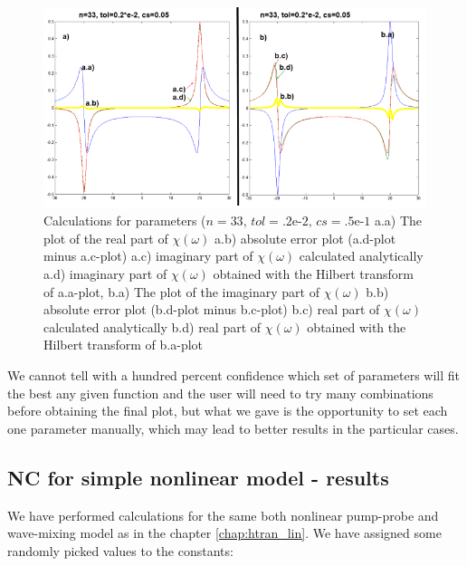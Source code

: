 \documentclass[12pt,twoside,a4paper]{article}
\numberwithin{equation}{subsection}
\numberwithin{figure}{subsection}
\begin{document}
\begin{figure}
  \includegraphics[width=150mm]{img/nc_lin4.png}
  \caption{Calculations for parameters ($n=33, \,tol=\mbox{.2e-2}, \,cs=\mbox{.5e-1}$
    a.a) The plot of the real part of $\chi (\omega )$
    a.b) absolute error plot (a.d-plot minus a.c-plot) 
    a.c) imaginary part of $\chi (\omega )$ calculated analytically 
    a.d) imaginary part of $\chi (\omega )$ obtained with the Hilbert transform of a.a-plot,
    b.a) The plot of the imaginary part of $\chi (\omega )$
    b.b) absolute error plot (b.d-plot minus b.c-plot) 
    b.c) real part of $\chi (\omega )$ calculated analytically 
    b.d) real part of $\chi (\omega )$ obtained with the Hilbert transform of b.a-plot
    \label{fig:nc_lin4} 
    }
\end{figure}

We cannot tell with a hundred percent confidence which set of parameters will fit the best any given function and the user will
need to try many combinations before obtaining the final plot, but what we gave is the opportunity to set each one parameter manually,
which may lead to better results in the particular cases.

\subsection{NC for simple nonlinear model - results} \label{chap:nc_nlo}

We have performed calculations for the same both nonlinear pump-probe and wave-mixing model as in the chapter \ref{chap:htran_lin}.
We have assigned some randomly picked values to the constants:
\end{document}
